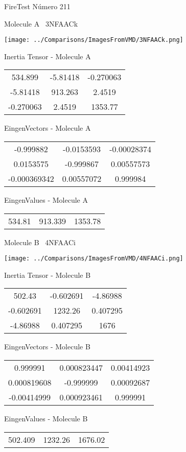 \vtab[-3cm]
\begin{center}
{\large FireTest \tab Número 211}
\end{center}
\begin{multicols}{2}
\begin{center}

Molecule A \
3NFAACk

\texttt{[image: ../Comparisons/ImagesFromVMD/3NFAACk.png]}

Inertia Tensor - Molecule A \\
\begin{tabular}{|c c c|}
534.899	 & 	-5.81418	 & 	-0.270063	 \\
-5.81418	 & 	913.263	 & 	2.4519	 \\
-0.270063	 & 	2.4519	 & 	1353.77
\end{tabular}

\vtab
 EingenVectors - Molecule A     \\
\begin{tabular}{|c c c|}
-0.999882	 & 	-0.0153593	 & 	-0.00028374	 \\
0.0153575	 & 	-0.999867	 & 	0.00557573	 \\
-0.000369342	 & 	0.00557072	 & 	0.999984
\end{tabular}

\vtab
 EingenValues - Molecule A     \\
\begin{tabular}{|c c c|}
534.81	 & 	913.339	 & 	1353.78	 \\
\end{tabular}
\columnbreak

Molecule B \
4NFAACi

\texttt{[image: ../Comparisons/ImagesFromVMD/4NFAACi.png]}

Inertia Tensor - Molecule B \\
\begin{tabular}{|c c c|}
502.43	 & 	-0.602691	 & 	-4.86988	 \\
-0.602691	 & 	1232.26	 & 	0.407295	 \\
-4.86988	 & 	0.407295	 & 	1676
\end{tabular}

\vtab
 EingenVectors - Molecule B     \\
\begin{tabular}{|c c c|}
0.999991	 & 	0.000823447	 & 	0.00414923	 \\
0.000819608	 & 	-0.999999	 & 	0.00092687	 \\
-0.00414999	 & 	0.000923461	 & 	0.999991
\end{tabular}

\vtab
 EingenValues - Molecule B     \\
\begin{tabular}{|c c c|}
502.409	 & 	1232.26	 & 	1676.02	 \\
\end{tabular}

\end{center}
\end{multicols}

